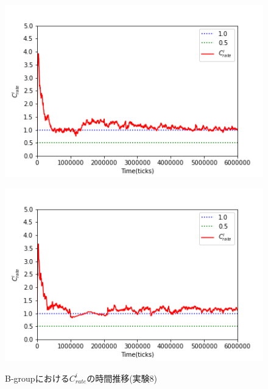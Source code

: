 \documentclass[12pt,a4j,twoside]{jarticle}
\begin{document}
  \begin{figure}
    \begin{minipage}{0.48\hsize}
      \centering
      \includegraphics[width=0.99\hsize]{figures/Rate_Complex_Bgroup_4.png}
      \label{subfig:rate_Complex_B_4}
    \end{minipage}
    \hfill
    \begin{minipage}{0.48\hsize}
      \centering
      \includegraphics[width=0.99\hsize]{figures/Rate_Complex_Bgroup_14.png}
      \label{subfig:rate_Complex_B_14}
    \end{minipage}
    \caption{B-groupにおける$C^i_{rate}$の時間推移(実験8)}
    \label{fig:rate_Complex_B}
  \end{figure}
\end{document}
